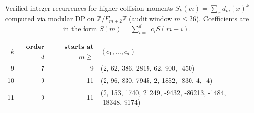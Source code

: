 \begin{table}[H]
\centering
\scriptsize
\setlength{\tabcolsep}{6pt}
\caption{Verified integer recurrences for higher collision moments $S_k(m)=\sum_x d_m(x)^k$ computed via modular DP on $\mathbb{Z}/F_{m+2}\mathbb{Z}$ (audit window $m\le 26$). Coefficients are in the form $S(m)=\sum_{i=1}^d c_i S(m-i)$.}
\label{tab:fold_collision_moment_recursions_9_11}
\begin{tabular}{r r r l}
\toprule
$k$ & order $d$ & starts at $m\ge$ & $(c_1,\dots,c_d)$\\
\midrule
9 & 7 & 9 & (2, 62, 386, 2819, 62, 900, -450)\\
10 & 9 & 11 & (2, 96, 830, 7945, 2, 1852, -830, 4, -4)\\
11 & 9 & 11 & (2, 153, 1740, 21249, -9432, -86213, -1484, -18348, 9174)\\
\bottomrule
\end{tabular}
\end{table}
